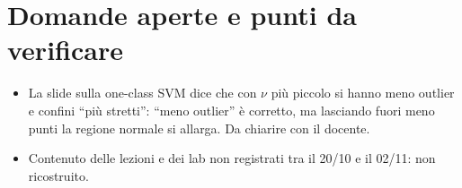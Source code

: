 \section{Domande aperte e punti da verificare}
\begin{verifica}
\begin{itemize}
  \item La slide sulla one-class SVM dice che con $\nu$ più piccolo si hanno meno outlier e confini
    ``più stretti'': ``meno outlier'' è corretto, ma lasciando fuori meno punti la regione normale si
    allarga. Da chiarire con il docente.
  \item Contenuto delle lezioni e dei lab non registrati tra il 20/10 e il 02/11: non ricostruito.
\end{itemize}
\end{verifica}
